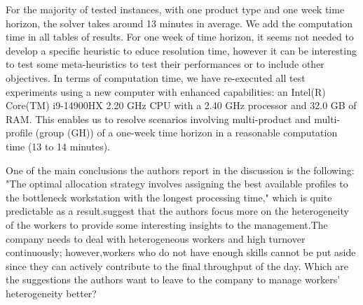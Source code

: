 \documentclass[preprint,11pt,3p]{elsarticle}
\begin{document}
\begin{tcolorbox}[colback=r_color1,colframe=r_color2,title=R14:]
For the majority of tested instances, with one product type and one week time horizon, the solver takes around 13 minutes in average.  We add the computation time in all tables of results. For one week of time horizon, it seems not needed to develop a specific heuristic to educe resolution time, however it can be interesting to test some meta-heuristics to test their performances or to include other objectives.  
In terms of computation time, we have re-executed all test experiments using a new computer with enhanced capabilities: an Intel(R) Core(TM) i9-14900HX 2.20 GHz CPU with a 2.40 GHz processor and 32.0 GB of RAM. This enables us to resolve scenarios involving multi-product and multi-profile (group (GH)) of a one-week time horizon in a reasonable computation time (13 to 14 minutes).

\end{tcolorbox}

\begin{tcolorbox}[colback=q_color1,colframe=q_color2,title=Q15  :] One of the main conclusions the authors report in the discussion is the following: "The optimal allocation strategy involves assigning the best available profiles to the bottleneck workstation with the longest processing time," which is quite predictable as a result.suggest that the authors focus more on the heterogeneity of the workers to provide some interesting insights to the management.The company needs to deal with heterogeneous workers and high turnover continuously; however,workers who do not have enough skills cannot be put aside since they can actively contribute to the final throughput of the day. Which are the suggestions the authors want to leave to the company to manage workers' heterogeneity better?
\end{tcolorbox}
\end{document}
